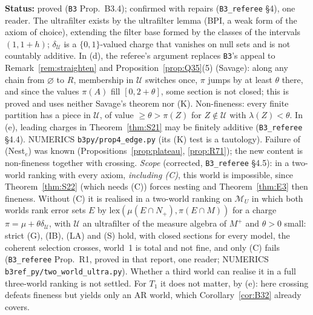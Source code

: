 \documentclass[11pt]{article}
\theoremstyle{definition}
\theoremstyle{remark}
\newcommand{\M}{\mathcal M}
\newcommand{\src}[1]{\texttt{#1}}
\newcommand{\status}[1]{\par\smallskip\noindent\textbf{Status:} #1\par\smallskip}
\begin{document}
\status{proved (\src{B3} Prop.~B3.4); confirmed with repairs (\src{B3\_referee} \S4), one reader. The ultrafilter exists by the ultrafilter lemma (BPI, a weak form of the axiom of choice), extending the filter base formed by the classes of the intervals $(1,1+h)$; $\delta_{\mathcal U}$ is a $\{0,1\}$-valued charge that vanishes on null sets and is not countably additive. In (d), the referee's argument replaces \src{B3}'s appeal to Remark~\ref{rem:straighten} and Proposition~\ref{prop:Q35}(5) (Savage): along any chain from $\varnothing$ to $R$, membership in $\mathcal U$ switches once, $\pi$ jumps by at least $\theta$ there, and since the values $\pi(A)$ fill $[0,2+\theta]$, some section is not closed; this is proved and uses neither Savage's theorem nor (K). Non-fineness: every finite partition has a piece in $\mathcal U$, of value $\ge\theta>\pi(Z)$ for $Z\notin\mathcal U$ with $\lambda(Z)<\theta$. In (e), leading charges in Theorem~\ref{thm:S21} may be finitely additive (\src{B3\_referee} \S4.4). NUMERICS \src{b3py/prop4\_edge.py} (its (K) test is a tautology). Failure of (Nest$_e$) was known (Propositions~\ref{prop:plateau}, \ref{prop:R71}); the new content is non-fineness together with crossing. \emph{Scope} (corrected, \src{B3\_referee} \S4.5): in a two-world ranking with every axiom, \emph{including (C)}, this world is impossible, since Theorem~\ref{thm:S22} (which needs (C)) forces nesting and Theorem~\ref{thm:E3} then fineness. Without (C) it is realised in a two-world ranking on $\M_U$ in which both worlds rank error sets $E$ by $\mathrm{lex}(\mu(E\cap N_+),\pi(E\cap M))$ for a charge $\pi=\mu+\theta\delta_{\mathcal U}$, with $\mathcal U$ an ultrafilter of the measure algebra of $M^+$ and $\theta>0$ small: strict (G), (IB), (LA) and (S) hold, with closed sections for every model, the coherent selection crosses, world~1 is total and not fine, and only (C) fails (\src{B3\_referee} Prop.~R1, proved in that report, one reader; NUMERICS \src{b3ref\_py/two\_world\_ultra.py}). Whether a third world can realise it in a full three-world ranking is not settled. For $T_1$ it does not matter, by (e): here crossing defeats fineness but yields only an AR world, which Corollary~\ref{cor:B32} already covers.}
\end{document}
